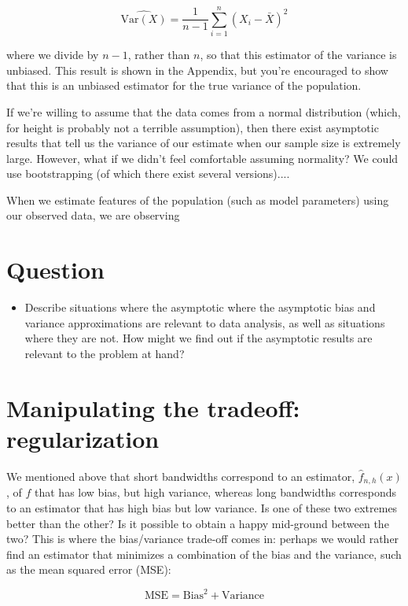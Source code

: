 $$\widehat{\text{Var}(X)} = \frac{1}{n-1} \sum_{i=1}^n (X_i - \bar{X})^2$$

where we divide by $n-1$, rather than $n$, so that this estimator of the variance is unbiased. This result is shown in the Appendix, but you're encouraged to show that this is an unbiased estimator for the true variance of the population.


If we're willing to assume that the data comes from a normal distribution (which, for height is probably not a terrible assumption), then there exist asymptotic results that tell us the variance of our estimate when our sample size is extremely large. However, what if we didn't feel comfortable assuming normality? We could use bootstrapping (of which there exist several versions)....



When we estimate features of the population (such as model parameters) using our observed data, we are observing



\section{Question}

\begin{itemize} 
\item Describe situations where the asymptotic where the asymptotic bias and variance approximations are relevant to data analysis, as well as situations where they are not. How might we find out if the asymptotic results are relevant to the problem at hand?
\end{itemize}


\section{Manipulating the tradeoff: regularization}



We mentioned above that short bandwidths correspond to an estimator, $\hat{f}_{n, h}(x)$, of $f$ that has low bias, but high variance, whereas long bandwidths corresponds to an estimator that has high bias but low variance. Is one of these two extremes better than the other? Is it possible to obtain a happy mid-ground between the two? This is where the bias/variance trade-off comes in: perhaps we would rather find an estimator that minimizes a combination of the bias and the variance, such as the mean squared error (MSE):

$$\text{MSE} = \text{Bias}^2 + \text{Variance}$$

